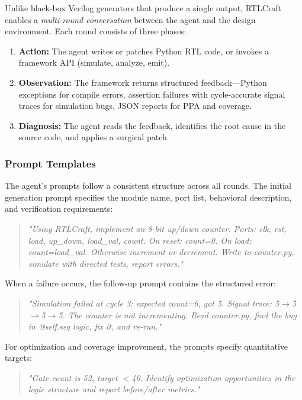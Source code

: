 \documentclass[11pt]{article}
\begin{document}
Unlike black-box Verilog generators that produce a single output, RTLCraft enables a \textit{multi-round conversation} between the agent and the design environment. Each round consists of three phases:

\begin{enumerate}
    \item \textbf{Action:} The agent writes or patches Python RTL code, or invokes a framework API (simulate, analyze, emit).
    \item \textbf{Observation:} The framework returns structured feedback---Python exceptions for compile errors, assertion failures with cycle-accurate signal traces for simulation bugs, JSON reports for PPA and coverage.
    \item \textbf{Diagnosis:} The agent reads the feedback, identifies the root cause in the source code, and applies a surgical patch.
\end{enumerate}

\subsubsection{Prompt Templates}

The agent's prompts follow a consistent structure across all rounds. The initial generation prompt specifies the module name, port list, behavioral description, and verification requirements:

\begin{quote}
\small\textit{"Using RTLCraft, implement an 8-bit up/down counter. Ports: clk, rst, load, up\_down, load\_val, count. On reset: count=0. On load: count=load\_val. Otherwise increment or decrement. Write to counter.py, simulate with directed tests, report errors."}
\end{quote}

When a failure occurs, the follow-up prompt contains the structured error:

\begin{quote}
\small\textit{"Simulation failed at cycle 3: expected count=6, got 5. Signal trace: 5$\rightarrow$5$\rightarrow$5$\rightarrow$5. The counter is not incrementing. Read counter.py, find the bug in @self.seq logic, fix it, and re-run."}
\end{quote}

For optimization and coverage improvement, the prompts specify quantitative targets:

\begin{quote}
\small\textit{"Gate count is 52, target $<$40. Identify optimization opportunities in the logic structure and report before/after metrics."}
\end{quote}
\end{document}
